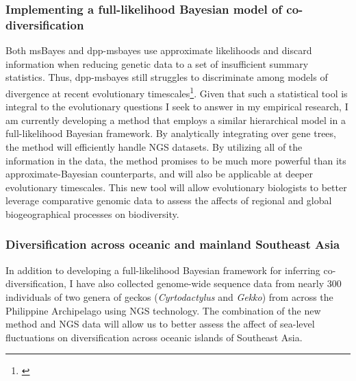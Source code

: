 \subsubsection*{Implementing a full-likelihood Bayesian model of
    co-diversification}
Both msBayes and dpp-msbayes use approximate likelihoods and discard
information when reducing genetic data to a set of insufficient summary
statistics.
Thus, dpp-msbayes still struggles to discriminate among models of divergence at
recent evolutionary timescales\footnote{\label{Oaks14dpp}}.
Given that such a statistical tool is integral to the evolutionary questions
I seek to answer in my empirical research,
I am currently developing a method that employs a similar hierarchical model in
a full-likelihood Bayesian framework.
By analytically integrating over gene trees, the method will efficiently handle
NGS datasets.
By utilizing all of the information in the data, the method promises to be much
more powerful than its approximate-Bayesian counterparts, and will also be
applicable at deeper evolutionary timescales.
This new tool will allow evolutionary biologists to better leverage comparative
genomic data to assess the affects of regional and global biogeographical
processes on biodiversity.

\subsubsection*{Diversification across oceanic and mainland Southeast Asia}
In addition to developing a full-likelihood Bayesian framework for inferring
co-diversification, I have also collected genome-wide sequence data from nearly
300 individuals of two genera of geckos (\emph{Cyrtodactylus} and \emph{Gekko})
from across the Philippine Archipelago using NGS technology.
The combination of the new method and NGS data will allow us to better assess
the affect of sea-level fluctuations on diversification across oceanic islands
of Southeast Asia.

